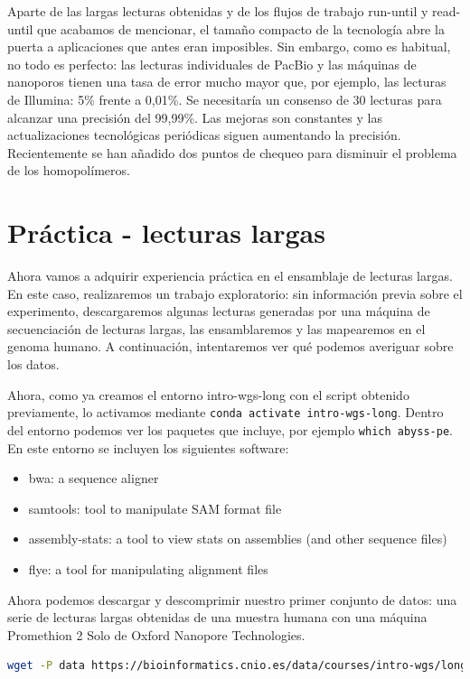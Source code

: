 Aparte de las largas lecturas obtenidas y de los flujos de trabajo run-until y read-until que acabamos de mencionar, el tamaño compacto de la tecnología abre la puerta a aplicaciones que antes eran imposibles.
Sin embargo, como es habitual, no todo es perfecto: las lecturas individuales de PacBio y las máquinas de nanoporos tienen una tasa de error mucho mayor que, por ejemplo, las lecturas de Illumina: 5\% frente a 0,01\%. Se necesitaría un consenso de 30 lecturas para alcanzar una precisión del 99,99\%.
Las mejoras son constantes y las actualizaciones tecnológicas periódicas siguen aumentando la precisión. Recientemente se han añadido dos puntos de chequeo para disminuir el problema de los homopolímeros.

\section{Práctica - lecturas largas}
Ahora vamos a adquirir experiencia práctica en el ensamblaje de lecturas largas.
En este caso, realizaremos un trabajo exploratorio: sin información previa sobre el experimento, descargaremos algunas lecturas generadas por una máquina de secuenciación de lecturas largas, las ensamblaremos y las mapearemos en el genoma humano. A continuación, intentaremos ver qué podemos averiguar sobre los datos.

Ahora, como ya creamos el entorno intro-wgs-long con el script obtenido previamente, lo activamos mediante \texttt{conda activate intro-wgs-long}. Dentro del entorno podemos ver los paquetes que incluye, por ejemplo \texttt{which abyss-pe}. En este entorno se incluyen los siguientes software:
\begin{itemize}
\item bwa: a sequence aligner
\item samtools: tool to manipulate SAM format file
\item assembly-stats: a tool to view stats on assemblies (and other sequence files)
\item flye: a tool for manipulating alignment files
\end{itemize}

Ahora podemos descargar y descomprimir nuestro primer conjunto de datos: una serie de lecturas largas obtenidas de una muestra humana con una máquina Promethion 2 Solo de Oxford Nanopore Technologies.
\begin{lstlisting}[language=bash]
wget -P data https://bioinformatics.cnio.es/data/courses/intro-wgs/long_reads.fastq.gz
\end{lstlisting}

